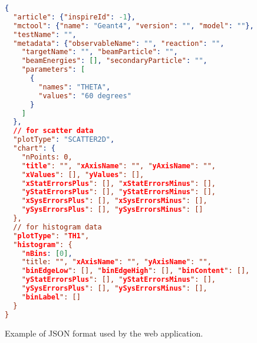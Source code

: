 \setcounter{figure}{0}
\renewcommand{\figurename}{Appendix}



\begin{figure}

\begin{lstlisting}[language=json,firstnumber=1]
{
  "article": {"inspireId": -1},
  "mctool": {"name": "Geant4", "version": "", "model": ""},
  "testName": "",
  "metadata": {"observableName": "", "reaction": "",
    "targetName": "", "beamParticle": "",
    "beamEnergies": [], "secondaryParticle": "",
    "parameters": [
      {
        "names": "THETA",
        "values": "60 degrees"
      }
    ]
  },
  // for scatter data
  "plotType": "SCATTER2D",
  "chart": {
    "nPoints: 0,
    "title": "", "xAxisName": "", "yAxisName": "",
    "xValues": [], "yValues": [],
    "xStatErrorsPlus": [], "xStatErrorsMinus": [],
    "yStatErrorsPlus": [], "yStatErrorsMinus": [],
    "xSysErrorsPlus": [], "xSysErrorsMinus": [],
    "ySysErrorsPlus": [], "ySysErrorsMinus": []
  },
  // for histogram data
  "plotType": "TH1",
  "histogram": {
    "nBins: [0],
    "title: "", "xAxisName": "", "yAxisName": "",
    "binEdgeLow": [], "binEdgeHigh": [], "binContent": [],
    "yStatErrorsPlus": [], "yStatErrorsMinus": [],
    "ySysErrorsPlus": [], "ySysErrorsMinus": [],
    "binLabel": []
  }
}
\end{lstlisting}

\caption{Example of JSON format used by the web application.}
\label{adx:JSON-format}
\end{figure}


